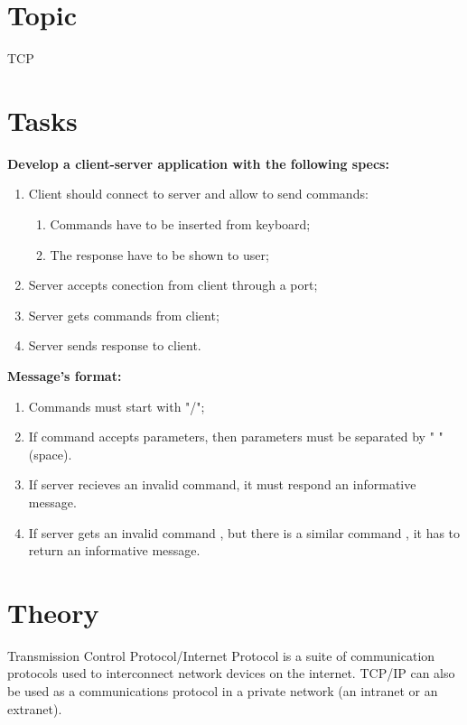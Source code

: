 \documentclass[12pt]{article}
\begin{document}

\newpage
{}
\setcounter{page}{2}
	\tableofcontents
	\newpage
	
	\section{Topic}
	TCP
	\section{Tasks}
\textbf{	Develop a client-server application with the following specs:}
	\begin{enumerate}
		\item Client should connect to server and allow to send commands:
		\begin{enumerate}
			\item Commands have to be inserted from keyboard;
			\item The response have to be shown to user;
		\end{enumerate}
		\item Server accepts conection from client through a port;
		\item Server gets commands from client;
		\item Server sends response to client.
	\end{enumerate}
	
	
	\textbf{Message's format:}
	\begin{enumerate}
		\item Commands must start with "/";
		\item If command accepts parameters, then parameters must be separated by " " (space).
		\item If server recieves an invalid command, it must respond an informative message.
		\item If server gets an invalid command , but there is a similar command , it has to return an informative message.
	\end{enumerate}
	

	

	\newpage
	\section{Theory}
	
	Transmission Control Protocol/Internet Protocol is a suite of communication protocols used to interconnect network devices on the internet. TCP/IP can also be used as a communications protocol in a private network (an intranet or an extranet).
	
\end{document}
